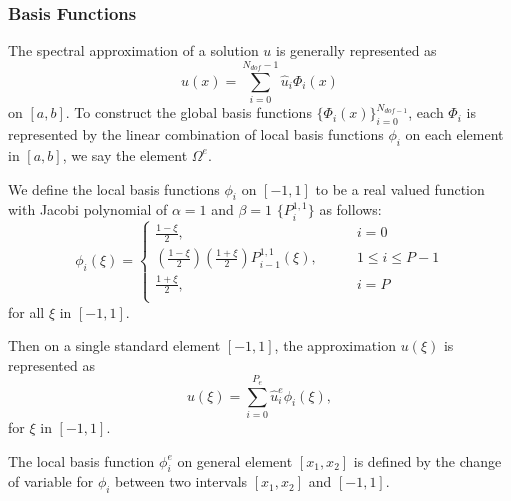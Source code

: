 

\subsubsection{Basis Functions}

The spectral approximation of a solution $u$ is generally
represented as
\begin{equation}\label{genrep}
u(x) = \sum_{i=0}^{N_{dof}-1} \hat u_i\Phi_i(x)
\end{equation}
on $[a, b]$. To construct the global basis functions
$\{\Phi_i(x)\}_{i=0}^{N_{dof-1}}$, each $\Phi_i$ is represented by
the linear combination of local basis functions $\phi_i$ on each
element in $[a, b]$, we say the element $\Omega^e$.

We define the local basis functions ${\phi_i}$ on $[-1, 1]$ to be a real valued function with Jacobi polynomial of $\alpha = 1$ and $\beta = 1$ $\{P_i^{1,1}\}$ as follows:
\begin{equation}
\label{locbasis}
  \phi_i(\xi) =\left \{
    \begin{array}{ll}
    \frac{1-\xi}{2}, & i=0 \\
    \left(\frac{1-\xi}{2}\right)\left(\frac{1+\xi}{2}\right)P_{i-1}^{1,1}(\xi),
    \qquad &1 \le i \le P-1 \\
    \frac{1+\xi}{2}, & i=P \\
    \end{array}   \right.
\end{equation}
for all $\xi$ in $[-1, 1]$.

Then on a single standard element $[-1, 1]$, the approximation $u(\xi)$ is represented as
\begin{equation}\label{locrep}
u(\xi) = \sum_{i=0}^{P_e} \hat u_{i}^{e}\phi_i(\xi),
\end{equation}
for $\xi$ in $[-1, 1]$.

The local basis function $\phi_i^e$ on general element $[x_1,
x_2]$ is defined by the change of variable for $\phi_i$ between
two intervals $[x_1, x_2]$ and $[-1, 1]$.

